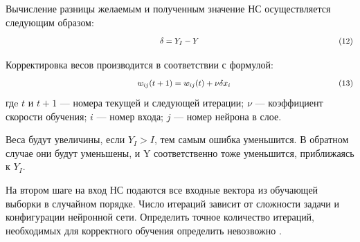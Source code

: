 \documentclass[a4paper,english,russian]{G2-105}
\begin{document}
\par Вычисление разницы желаемым и полученным значение НС осуществляется следующим образом:
\[
\ \hspace*{66mm} \delta=Y_I-Y \ \hspace*{60mm} (12)
\] 
\par Корректировка весов производится в соответствии с формулой:
\[
\ \hspace*{55mm} w_{ij}(t+1)=w_{ij}(t)+\nu        \delta x_i \ \hspace*{45mm} (13)
\]
гдe $t$ и $t+1$ --- номера текущей и следующей итерации; $\nu$ --- коэффициент скорости обучения; $i$ --- номер входа; $j$ --- номер нейрона в слое.
\par Веса будут увеличины, если $Y_I>I$, тем самым ошибка уменьшится. В обратном случае они будут уменьшены, и Y соответственно тоже уменьшится, приближаясь к $Y_I$.
\par На втором шаге на вход НС подаются все входные вектора из обучающей выборки в случайном порядке. Число итераций зависит от сложности задачи и конфигурации нейронной сети. Определить точное количество итераций, необходимых для корректного обучения определить невозвожно \cite{14}. 
\ttl
\end{document}
